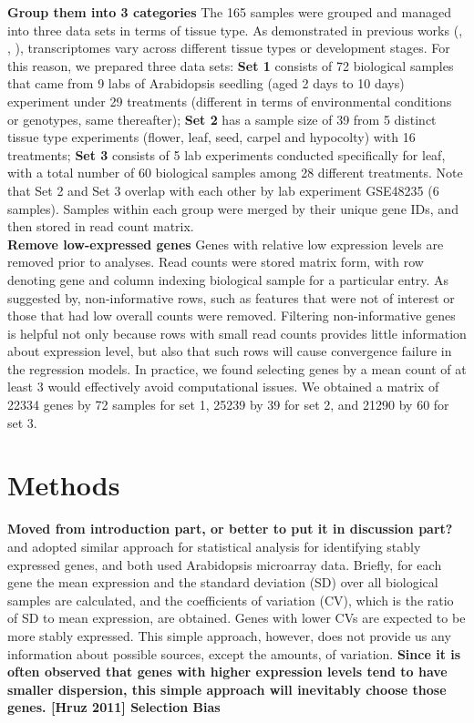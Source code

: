\documentclass[11pt, a4paper]{article}
\begin{document}
\textbf{Group them into 3 categories} The 165 samples were grouped and managed into three data sets in terms of tissue type.  As demonstrated in previous works (\cite{czechowski2005genome}, \cite{hruz2011refgenes}, \cite{dekkers2012identification}), transcriptomes vary across different tissue types or development stages. For this reason, we prepared three data sets: \textbf{Set 1} consists of 72 biological samples that came from 9 labs of Arabidopsis seedling (aged 2 days to 10 days) experiment under 29 treatments (different in terms of environmental conditions or genotypes, same thereafter); \textbf{Set 2} has a sample size of 39 from 5 distinct tissue type experiments (flower, leaf, seed, carpel and hypocolty) with 16 treatments; \textbf{Set 3} consists of 5 lab experiments conducted specifically for leaf, with a total number of 60 biological samples among 28 different treatments. Note that  Set 2 and Set 3 overlap with each other by lab experiment GSE48235 (6 samples). Samples within each group were merged by their unique gene IDs, and then stored in read count matrix.  \\

\textbf{Remove low-expressed genes} Genes with relative low expression levels are removed prior to analyses. Read counts were stored matrix form, with row denoting gene and column indexing biological sample for a particular entry.
As suggested by\cite{anders2013count}, non-informative rows, such as features that were not of interest or those that had low overall counts were removed. Filtering non-informative genes is helpful not only because rows with small read counts provides little information about expression level,  but also that such rows will cause convergence failure in the regression models. In practice,  we found selecting genes by a mean count of at least 3 would effectively avoid computational issues.  We obtained a matrix of 22334 genes by 72 samples for set 1, 25239 by 39 for set 2, and 21290 by 60  for set 3.  


\section{Methods}

\textbf{Moved from introduction part, or better to put it in discussion part?}
\cite{czechowski2005genome} and \cite{dekkers2012identification} adopted similar approach for statistical analysis for identifying stably expressed genes, and both used Arabidopsis microarray data. Briefly, for each gene the mean expression and the standard deviation (SD) over all biological samples are calculated, and the coefficients of variation (CV), which is the ratio of SD to mean expression, are obtained. Genes with lower CVs are expected to be more stably expressed. This simple approach, however, does not provide us any information about possible sources, except the amounts,  of variation.  \textbf{Since it is often observed that genes with higher expression levels tend to have smaller dispersion, this simple approach will inevitably choose those genes. [Hruz 2011] Selection Bias}\\ 
\end{document}
